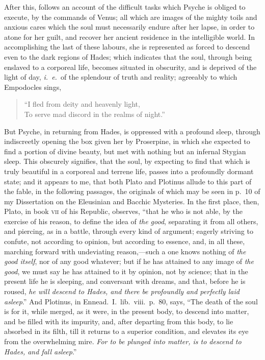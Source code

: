 \documentclass[12pt]{article}
\begin{document}
{After this, follows an account of the difficult tasks which Psyche is obliged
to execute, by the commands of Venus; all which are images of the mighty toils
and anxious cares which the soul must necessarily endure after her lapse, in
order to atone for her guilt, and recover her ancient residence in the
intelligible world. In accomplishing the last of these labours, she is
represented as forced to descend even to the dark regions of Hades; which
indicates that the soul, through being enslaved to a corporeal life, becomes
situated in obscurity, and is deprived of the light of day, \textit{i.~e.}~of
the splendour of truth and reality; agreeably to which Empodocles sings,

\begin{verse}
``I fled from deity and heavenly light,\\
To serve mad discord in the realms of night.''
\end{verse}

\noindent But Psyche, in returning from Hades, is oppressed with a profound
sleep, through indiscreetly opening the box given her by Proserpine, in which
she expected to find a portion of divine beauty, but met with nothing but an
infernal Stygian sleep. This obscurely signifies, that the soul, by expecting
to find that which is truly beautiful in a corporeal and terrene life, passes
into a profoundly dormant state; and it appears to me, that both Plato and
Plotinus allude to this part of the fable, in the following passages, the
originals of which may be seen in p.~10 of my Dissertation on the Eleusinian
and Bacchic Mysteries. In the first place, then, Plato, in book \textsc{vii} of
his Republic, observes, ``that he who is not able, by the exercise of his
reason, to define the idea of \textit{the good}, separating it from all others,
and piercing, as in a battle, through every kind of argument; eagerly striving
to confute, not according to opinion, but according to essence, and, in all
these, marching forward with undeviating reason,---such a one knows nothing of
\textit{the good itself}, nor of any good whatever; but if he has attained to
any image of \textit{the good}, we must say he has attained to it by opinion,
not by science; that in the present life he is sleeping, and conversant with
dreams, and that, before he is roused, \textit{he will descend to Hades, and
there be profoundly and perfectly laid asleep}.'' And Plotinus, in
Ennead.~I.~lib.~viii.~p.~80, says, ``The death of the soul is for it, while
merged, as it were, in the present body, to descend into matter, and be filled
with its impurity, and, after departing from this body, to lie absorbed in its
filth, till it returns to a superior condition, and elevates its eye from the
overwhelming mire. \textit{For to be plunged into matter, is to descend to
Hades, and fall asleep}.''

}
\end{document}
